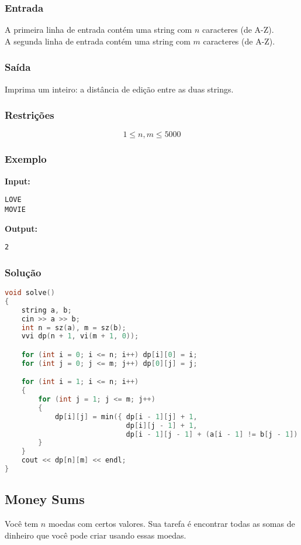\subsubsection*{Entrada}
A primeira linha de entrada contém uma string com \( n \) caracteres (de A-Z).\\
A segunda linha de entrada contém uma string com \( m \) caracteres (de A-Z).

\subsubsection*{Saída}
Imprima um inteiro: a distância de edição entre as duas strings.

\subsubsection*{Restrições}
\[
1 \le n, m \le 5000
\]

\subsubsection*{Exemplo}

\textbf{Input:}
\begin{verbatim}
LOVE
MOVIE
\end{verbatim}

\textbf{Output:}
\begin{verbatim}
2
\end{verbatim}

\subsubsection*{Solução}
\begin{lstlisting}[language=C++]
void solve()
{
    string a, b;
    cin >> a >> b;
    int n = sz(a), m = sz(b);
    vvi dp(n + 1, vi(m + 1, 0));

    for (int i = 0; i <= n; i++) dp[i][0] = i;
    for (int j = 0; j <= m; j++) dp[0][j] = j;

    for (int i = 1; i <= n; i++)
    {
        for (int j = 1; j <= m; j++)
        {
            dp[i][j] = min({ dp[i - 1][j] + 1,
                             dp[i][j - 1] + 1,
                             dp[i - 1][j - 1] + (a[i - 1] != b[j - 1]) });
        }
    }
    cout << dp[n][m] << endl;
}
\end{lstlisting}

\subsection{Money Sums}
Você tem \( n \) moedas com certos valores. Sua tarefa é encontrar todas as somas de dinheiro que você pode criar usando essas moedas.

